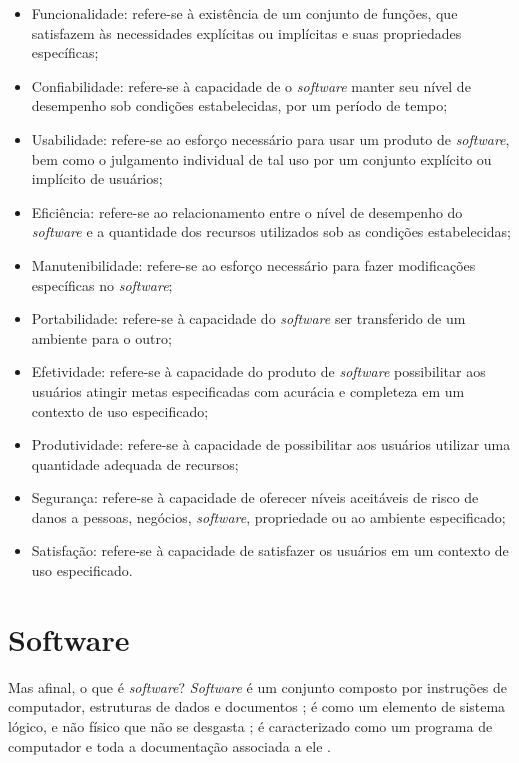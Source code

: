 \begin{itemize}
    \item Funcionalidade: refere-se à existência de um conjunto de funções, que satisfazem às
necessidades explícitas ou implícitas e suas propriedades específicas;

    \item Confiabilidade: refere-se à capacidade de o \textit{software} manter seu nível de
desempenho sob condições estabelecidas, por um período de tempo;
    \item  Usabilidade: refere-se ao esforço necessário para usar um produto de \textit{software}, bem
como o julgamento individual de tal uso por um conjunto explícito ou implícito de
usuários;
    \item  Eficiência: refere-se ao relacionamento entre o nível de desempenho do \textit{software} e a
quantidade dos recursos utilizados sob as condições estabelecidas;
    \item  Manutenibilidade: refere-se ao esforço necessário para fazer modificações
específicas no \textit{software};
    \item  Portabilidade: refere-se à capacidade do \textit{software} ser transferido de um ambiente
para o outro;
    \item  Efetividade: refere-se à capacidade do produto de \textit{software} possibilitar aos usuários
atingir metas especificadas com acurácia e completeza em um contexto de uso
especificado;
    \item  Produtividade: refere-se à capacidade de possibilitar aos usuários utilizar uma
quantidade adequada de recursos;
    \item  Segurança: refere-se à capacidade de oferecer níveis aceitáveis de risco de danos a
pessoas, negócios, \textit{software}, propriedade ou ao ambiente especificado;
    \item Satisfação: refere-se à capacidade de satisfazer os usuários em um contexto de uso especificado.
\end{itemize}

\section{Software}

Mas afinal, o que é \textit{software}? \textit{Software} é um conjunto composto por instruções de computador, estruturas de dados e documentos \cite{PRESSMAN2006}; é como um elemento de sistema lógico, e não físico que não se desgasta \cite{PRESSMAN2002}; é caracterizado como um programa de computador e toda a documentação associada a ele \cite{SOMMERVILLE2003}.

